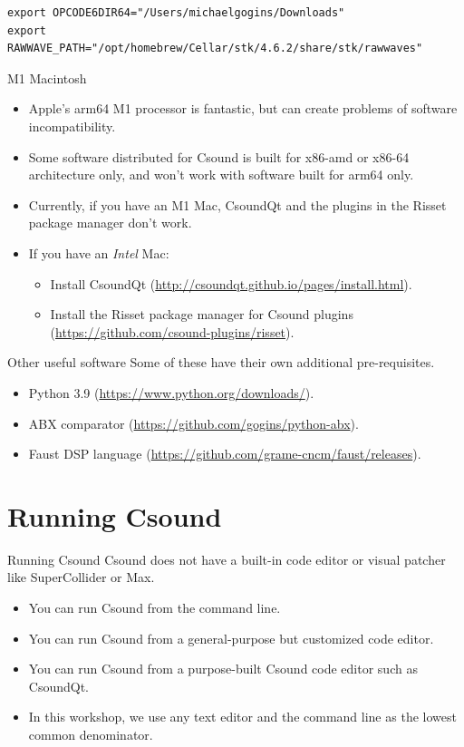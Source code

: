 \documentclass{beamer}
\begin{document}
\begin{lstlisting}
export OPCODE6DIR64="/Users/michaelgogins/Downloads"
export RAWWAVE_PATH="/opt/homebrew/Cellar/stk/4.6.2/share/stk/rawwaves"
\end{lstlisting}

\begin{frame}{M1 Macintosh}
\begin{itemize}
\item Apple's arm64 M1 processor is fantastic, but can create problems of software incompatibility.
\item Some software distributed for Csound is built for x86-amd or x86-64 architecture only, and won't work with software built for arm64 only.
\item Currently, if you have an M1 Mac, CsoundQt and the plugins in the Risset package manager don't work.
\item If you have an \emph{Intel} Mac:
\begin{itemize}
\item Install CsoundQt (\url{http://csoundqt.github.io/pages/install.html}).
\item Install the Risset package manager for Csound plugins (\url{https://github.com/csound-plugins/risset}). 
\end{itemize}
\end{itemize}
\end{frame}

\begin{frame}{Other useful software}
Some of these have their own additional pre-requisites.
\begin{itemize}
\item Python 3.9 (\url{https://www.python.org/downloads/}).
\item ABX comparator (\url{https://github.com/gogins/python-abx}).
\item Faust DSP language (\url{https://github.com/grame-cncm/faust/releases}).
\end{itemize}
\end{frame}

\section{Running Csound}
\begin{frame}{Running Csound}
Csound does not have a built-in code editor or visual patcher like SuperCollider or Max.
\begin{itemize}
\item You can run Csound from the command line.
\item You can run Csound from a general-purpose but customized code editor.
\item You can run Csound from a purpose-built Csound code editor such as CsoundQt.
\item In this workshop, we use any text editor and the command line as the lowest common denominator.
\end{itemize}
\end{frame}
\end{document}
